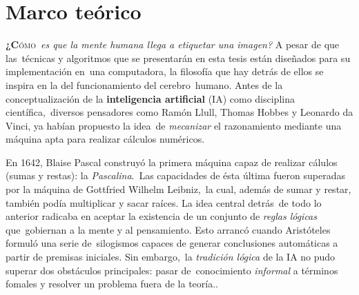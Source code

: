 \chapter{Marco teórico}
\label{chap:marco-teorico}

\noindent
\lettrine[lines=2, lhang=0.33, loversize=0.25]{\textbf{¿C}}{ómo}\
\emph{es que la mente humana llega a etiquetar una imagen?} A pesar de que las\
técnicas y algoritmos que se presentarán en esta tesis están diseñados para su implementación en\
una computadora, la filosofía que hay detrás de ellos se inspira en la del funcionamiento del cerebro\
humano. Antes de la conceptualización de la \textbf{inteligencia artificial} (IA) como disciplina científica,\
diversos pensadores como Ramón Llull, Thomas Hobbes y Leonardo da Vinci, ya habían propuesto la idea\
de \emph{mecanizar} el razonamiento mediante una máquina apta para realizar cálculos numéricos. \cite{russell2010}\par
En 1642, Blaise Pascal construyó la primera máquina capaz de realizar cálulos (sumas y restas): la \emph{Pascalina}.\
Las capacidades de ésta última fueron superadas por la máquina de Gottfried Wilhelm Leibniz,\
la cual, además de sumar y restar, también podía multiplicar y sacar raíces. La idea central detrás\
de todo lo anterior radicaba en aceptar la existencia de un conjunto de \emph{reglas lógicas} que\
gobiernan a la mente y al pensamiento. Esto arrancó cuando Aristóteles formuló una serie de\
silogismos capaces de generar conclusiones automáticas a partir de premisas iniciales. Sin embargo,\
la \emph{tradición lógica} de la IA no pudo superar dos obstáculos principales: pasar de\
conocimiento \emph{informal} a términos fomales y resolver un problema fuera de la teoría.\cite{russell2010}.\par




